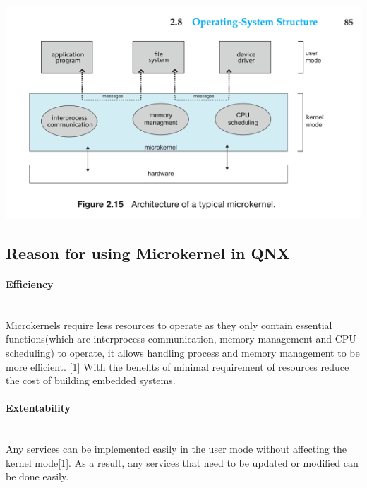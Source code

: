\documentclass[conference]{IEEEtran}
\begin{document}
\begin{center}
\includegraphics[scale=0.4]{./images/QNX_OS.png}
\end{center}
\subsection{Reason for using Microkernel in QNX}
\paragraph{Efficiency}\mbox{} \\
Microkernels require less resources to operate as they only contain essential functions(which are interprocess communication, memory management and CPU scheduling) to operate, it allows handling process and memory management to be more efficient. [1] With the benefits of minimal requirement of resources reduce the cost of building embedded systems.
\\
\paragraph{Extentability}\mbox{} \\
Any services can be implemented easily in the user mode without affecting the kernel mode[1]. As a result, any services that need to be updated or modified can be done easily.
\\
\end{document}
